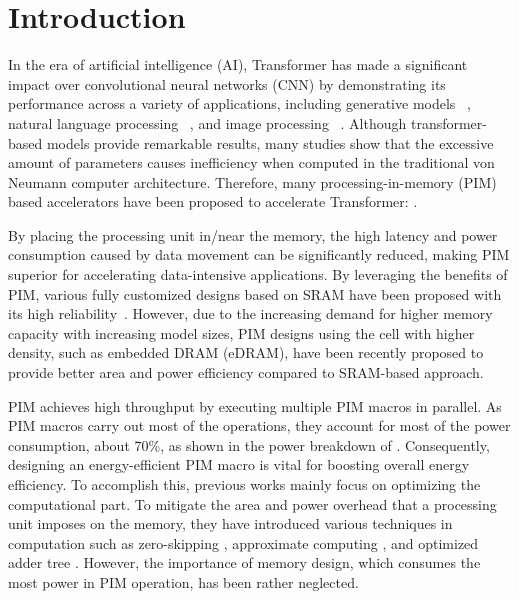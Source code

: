 


\section{Introduction}
\label{introduction}

In the era of artificial intelligence (AI), Transformer has made a significant impact over convolutional neural networks (CNN) by demonstrating its performance across a variety of applications, including generative models ~\cite{radford2019language}, natural language processing ~\cite{devlin2018bert}, and image processing ~\cite{liu2022video}. Although transformer-based models provide remarkable results, many studies show that the excessive amount of parameters causes inefficiency when computed in the traditional von Neumann computer architecture. Therefore, many processing-in-memory (PIM) based accelerators have been proposed to accelerate Transformer: \cite{zhou2022transpim, tu2022trancim,kim2022overview, PIM_TRANS_01, PIM_TRANS_02, PIM_TRANS_03, PIM_TRANS_04}.

By placing the processing unit in/near the memory, the high latency and power consumption caused by data movement can be significantly reduced, making PIM superior for accelerating data-intensive applications. 
By leveraging the benefits of PIM, various fully customized designs based on SRAM have been proposed with its high reliability~\cite{kim2020z, heo2022t, kim2023sp, SRAM_PIM_01, SRAM_PIM_02, SRAM_PIM_03, SRAM_PIM_04, SRAM_PIM_05, SRAM_PIM_06}. However, due to the increasing demand for higher memory capacity with increasing model sizes, PIM designs using the cell with higher density, such as embedded DRAM (eDRAM), have been recently proposed \cite{kim2023dynaplasia, xie2022gain, eDRAM_PIM_01, eDRAM_PIM_02, eDRAM_PIM_03} to provide better area and power efficiency compared to SRAM-based approach.

PIM achieves high throughput by executing multiple PIM macros in parallel. As PIM macros carry out most of the operations, they account for most of the power consumption, about 70\%, as shown in the power breakdown of \cite{tu2022trancim}. Consequently, designing an energy-efficient PIM macro is vital for boosting overall energy efficiency. To accomplish this, previous works mainly focus on optimizing the computational part. To mitigate the area and power overhead that a processing unit imposes on the memory, they have introduced various techniques in computation such as zero-skipping \cite{kim2020z}, approximate computing \cite{wang2022dimc}, and optimized adder tree \cite{chih202116}. However, the importance of memory design, which consumes the most power in PIM operation, has been rather neglected.

